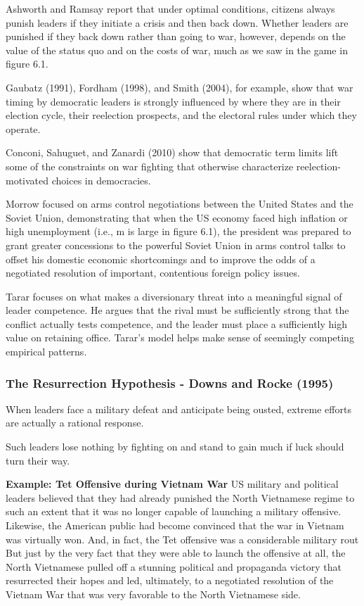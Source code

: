 Ashworth and Ramsay report that under optimal conditions, citizens always punish leaders if they initiate a crisis and then back down. Whether leaders are punished if they back down rather than going to war, however, depends on the value of the status quo and on the costs of war, much as we saw in the game in figure 6.1.

Gaubatz (1991), Fordham (1998), and Smith (2004), for example, show that war timing by democratic leaders is strongly influenced by where they are in their election cycle, their reelection prospects, and the electoral rules under which they operate.

Conconi, Sahuguet, and Zanardi (2010) show that democratic term limits lift some of the constraints on war fighting that otherwise characterize reelection-motivated choices in democracies.

Morrow focused on arms control negotiations between the United States and the Soviet Union, demonstrating that when the US economy faced high inflation or high unemployment (i.e., m is large in figure 6.1), the president was prepared to grant greater concessions to the powerful Soviet Union in arms control talks to offset his domestic economic shortcomings and to improve the odds of a negotiated resolution of important, contentious foreign policy issues.

Tarar focuses on what makes a diversionary threat into a meaningful signal of leader competence. He argues that the rival must be sufficiently strong that the conflict actually tests competence, and the leader must place a sufficiently high value on retaining office. Tarar’s model helps make sense of seemingly competing empirical patterns.

\subsubsection{The Resurrection Hypothesis - Downs and Rocke (1995)}
When leaders face a military defeat and anticipate being ousted, extreme efforts are actually a rational response.

Such leaders lose nothing by fighting on and stand to gain much if luck should turn their way.

\textbf{Example: Tet Offensive during Vietnam War}
US military and political leaders believed that they had already punished the North Vietnamese regime to such an extent that it was no longer capable of launching a military offensive. Likewise, the American public had become convinced that the war in Vietnam was virtually won. And, in fact, the Tet offensive was a considerable military rout But just by the very fact that they were able to launch the offensive at all, the North Vietnamese pulled off a stunning political and propaganda victory that resurrected their hopes and led, ultimately, to a negotiated resolution of the Vietnam War that was very favorable to the North Vietnamese side.

